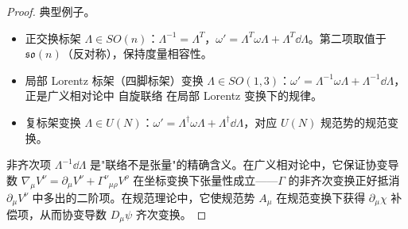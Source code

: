 \begin{proof}
典型例子。
\begin{itemize}
\item 正交换标架 $\Lambda\in SO(n)$：$\Lambda^{-1}=\Lambda^T$，$\omega'=\Lambda^T\omega\Lambda+\Lambda^T\dd\Lambda$。第二项取值于 $\mathfrak{so}(n)$（反对称），保持度量相容性。
\item 局部 Lorentz 标架（四脚标架）变换 $\Lambda\in SO(1,3)$：$\omega'=\Lambda^{-1}\omega\Lambda+\Lambda^{-1}\dd\Lambda$，正是广义相对论中 自旋联络 在局部 Lorentz 变换下的规律。
\item 复标架变换 $\Lambda\in U(N)$：$\omega'=\Lambda^\dagger\omega\Lambda+\Lambda^\dagger\dd\Lambda$，对应 $U(N)$ 规范势的规范变换。
\end{itemize}

非齐次项 $\Lambda^{-1}\dd\Lambda$ 是"联络不是张量"的精确含义。在广义相对论中，它保证协变导数 $\nabla_\mu V^\nu=\partial_\mu V^\nu+\Gamma^\nu{}_{\mu\rho}V^\rho$ 在坐标变换下张量性成立——$\Gamma$ 的非齐次变换正好抵消 $\partial_\mu V^\nu$ 中多出的二阶项。在规范理论中，它使规范势 $A_\mu$ 在规范变换下获得 $\partial_\mu\chi$ 补偿项，从而协变导数 $D_\mu\psi$ 齐次变换。
\end{proof}

